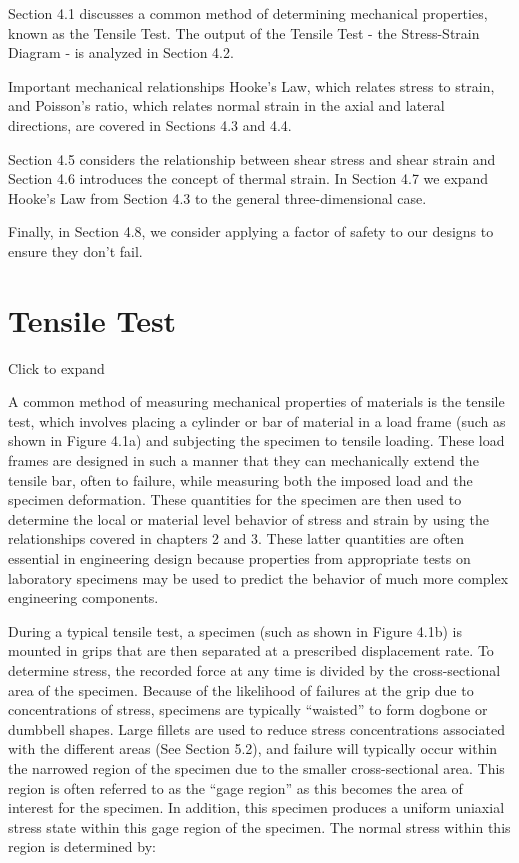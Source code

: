 \documentclass[
  letterpaper,
  DIV=11,
  numbers=noendperiod]{scrreprt}
\theoremstyle{definition}
\theoremstyle{remark}
\begin{document}
Section 4.1 discusses a common method of determining mechanical
properties, known as the Tensile Test. The output of the Tensile Test -
the Stress-Strain Diagram - is analyzed in Section 4.2.

Important mechanical relationships Hooke's Law, which relates stress to
strain, and Poisson's ratio, which relates normal strain in the axial
and lateral directions, are covered in Sections 4.3 and 4.4.

Section 4.5 considers the relationship between shear stress and shear
strain and Section 4.6 introduces the concept of thermal strain. In
Section 4.7 we expand Hooke's Law from Section 4.3 to the general
three-dimensional case.

Finally, in Section 4.8, we consider applying a factor of safety to our
designs to ensure they don't fail.

\section{Tensile Test}\label{sec-4.1}

Click to expand

A common method of measuring mechanical properties of materials is the
tensile test, which involves placing a cylinder or bar of material in a
load frame (such as shown in Figure 4.1a) and subjecting the specimen to
tensile loading. These load frames are designed in such a manner that
they can mechanically extend the tensile bar, often to failure, while
measuring both the imposed load and the specimen deformation. These
quantities for the specimen are then used to determine the local or
material level behavior of stress and strain by using the relationships
covered in chapters 2 and 3. These latter quantities are often essential
in engineering design because properties from appropriate tests on
laboratory specimens may be used to predict the behavior of much more
complex engineering components.

During a typical tensile test, a specimen (such as shown in Figure 4.1b)
is mounted in grips that are then separated at a prescribed displacement
rate. To determine stress, the recorded force at any time is divided by
the cross-sectional area of the specimen. Because of the likelihood of
failures at the grip due to concentrations of stress, specimens are
typically ``waisted'' to form dogbone or dumbbell shapes. Large fillets
are used to reduce stress concentrations associated with the different
areas (See Section 5.2), and failure will typically occur within the
narrowed region of the specimen due to the smaller cross-sectional area.
This region is often referred to as the ``gage region'' as this becomes
the area of interest for the specimen. In addition, this specimen
produces a uniform uniaxial stress state within this gage region of the
specimen. The normal stress within this region is determined by:
\end{document}
